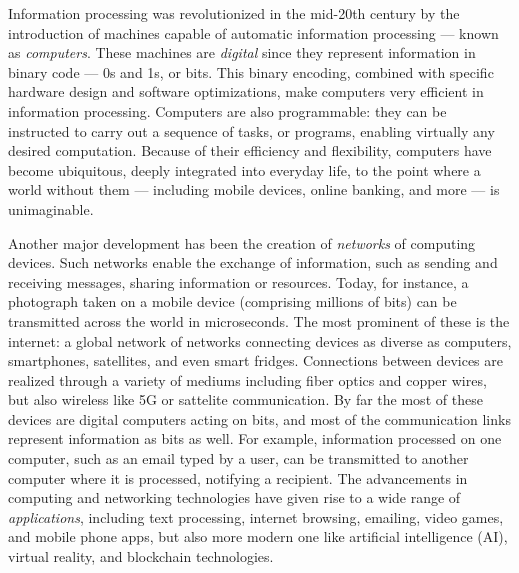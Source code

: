 Information processing was revolutionized in the mid-20th century by the introduction of machines capable of automatic information processing --- known as \emph{computers}.
These machines are \emph{digital} since they represent information in binary code --- 0s and 1s, or bits.
This binary encoding, combined with specific hardware design and software optimizations, make computers very efficient in information processing.
Computers are also programmable: they can be instructed to carry out a sequence of tasks, or programs, enabling virtually any desired computation.
Because of their efficiency and flexibility, computers have become ubiquitous, deeply integrated into everyday life, to the point where a world without them --- including mobile devices, online banking, and more --- is unimaginable.

Another major development has been the creation of \emph{networks} of computing devices.
Such networks enable the exchange of information, such as sending and receiving messages, sharing information or resources.
Today, for instance, a photograph taken on a mobile device (comprising millions of bits) can be transmitted across the world in microseconds.
The most prominent of these is the internet: a global network of networks connecting devices as diverse as computers, smartphones, satellites, and even smart fridges.
Connections between devices are realized through a variety of mediums including fiber optics and copper wires, but also wireless like 5G or sattelite communication.
By far the most of these devices are digital computers acting on bits, and most of the communication links represent information as bits as well.
For example, information processed on one computer, such as an email typed by a user, can be transmitted to another computer where it is processed, notifying a recipient. The advancements in computing and networking technologies have given rise to a wide range of \emph{applications}, including text processing, internet browsing, emailing, video games, and mobile phone apps, but also more modern one like artificial intelligence (AI), virtual reality, and blockchain technologies.


